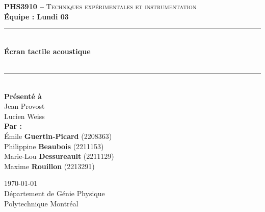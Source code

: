 \documentclass[11pt,letterpaper]{article}
\begin{document}
\begin{titlepage}
\center

\begin{figure}
\end{figure}
\vspace*{2 cm}

\textsc{\Large \textbf{PHS3910 --} Techniques expérimentales et instrumentation}\\[0.5cm]
\large{\textbf{Équipe : Lundi 03}}\\[1.5cm]

\rule{\linewidth}{0.5mm} \\[0.5cm]
\Large{\textbf{Écran tactile acoustique}} \\[0.2cm]
\\
\rule{\linewidth}{0.2mm} \\[2.3cm]

\large{\textbf{Présenté à}\\
  Jean Provost\\
  Lucien Weiss\\[2.5cm]
  \textbf{Par :}\\
  Émile \textbf{Guertin-Picard} (2208363)\\
  Philippine \textbf{Beaubois} (2211153)\\
  Marie-Lou \textbf{Dessureault} (2211129)\\
  Maxime \textbf{Rouillon} (2213291)\\[3cm]}

\large{\today\\
Département de Génie Physique\\
Polytechnique Montréal\\}

\end{titlepage}


\tableofcontents
{}
\newpage

\pagestyle{fancy}
\setlength{\headheight}{14pt}
\renewcommand{\headrulewidth}{0pt}
\fancyfoot[R]{\thepage}

\pagestyle{fancy}
\fancyhf{}
\renewcommand{\headrulewidth}{1pt}
\fancyhead[R]{\today}
\fancyfoot[R]{\thepage}

\setcounter{page}{1}
\end{document}
